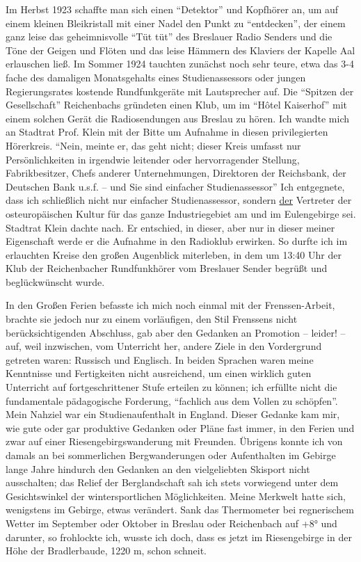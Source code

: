 \documentclass[a5paper,pagesize,10pt,twoside=true]{scrbook}
\begin{document}
Im Herbst 1923 schaffte man sich einen \enquote{Detektor} und Kopfhörer an, um auf einem kleinen Bleikristall mit einer Nadel den Punkt zu \enquote{entdecken}, der einem ganz leise das geheimnisvolle \enquote{Tüt tüt} des Breslauer Radio Senders und die Töne der Geigen und Flöten und das leise Hämmern des Klaviers der Kapelle Aal erlauschen ließ. Im Sommer 1924 tauchten zunächst noch sehr teure, etwa das 3-4 fache des damaligen Monatsgehalts eines Studienassessors oder jungen Regierungsrates kostende Rundfunkgeräte mit Lautsprecher auf. Die \enquote{Spitzen der Gesellschaft} Reichenbachs gründeten einen Klub, um im \enquote{Hôtel Kaiserhof} mit einem solchen Gerät die Radiosendungen aus Breslau zu hören. Ich wandte mich an Stadtrat Prof. Klein mit der Bitte um Aufnahme in diesen privilegierten Hörerkreis. \enquote{Nein, meinte er, das geht nicht; dieser Kreis umfasst nur Persönlichkeiten in irgendwie leitender oder hervorragender Stellung, Fabrikbesitzer, Chefs anderer Unternehmungen, Direktoren der Reichsbank, der Deutschen Bank u.s.f. -- und Sie sind einfacher Studienassessor} Ich entgegnete, dass ich schließlich nicht nur einfacher Studienassessor, sondern \underline{der} Vertreter der osteuropäischen Kultur für das ganze Industriegebiet am und im Eulengebirge sei. Stadtrat Klein dachte nach. Er entschied, in dieser, aber nur in dieser meiner Eigenschaft werde er die Aufnahme in den Radioklub erwirken. So durfte ich im erlauchten Kreise den großen Augenblick miterleben, in dem um 13:40 Uhr der Klub der Reichenbacher Rundfunkhörer vom Breslauer Sender begrüßt und beglückwünscht wurde.

In den Großen Ferien befasste ich mich noch einmal mit der Frenssen-Arbeit, brachte sie jedoch nur zu einem vorläufigen, den Stil Frenssens nicht berücksichtigenden Abschluss, gab aber den Gedanken an Promotion -- leider! -- auf, weil inzwischen, vom Unterricht her, andere Ziele in den Vordergrund getreten waren: Russisch und Englisch. In beiden Sprachen waren meine Kenntnisse und Fertigkeiten nicht ausreichend, um einen wirklich guten Unterricht auf fortgeschrittener Stufe erteilen zu können; ich erfüllte nicht die fundamentale pädagogische Forderung, \enquote{fachlich aus dem Vollen zu schöpfen}. Mein Nahziel war ein Studienaufenthalt in England. Dieser Gedanke kam mir, wie gute oder gar produktive Gedanken oder Pläne fast immer, in den Ferien und zwar auf einer Riesengebirgswanderung mit Freunden. Übrigens konnte ich von damals an bei sommerlichen Bergwanderungen oder Aufenthalten im Gebirge lange Jahre hindurch den Gedanken an den vielgeliebten Skisport nicht ausschalten; das Relief der Berg\-land\-schaft sah ich stets vorwiegend unter dem Gesichtswinkel der wintersportlichen Möglichkeiten. Meine Merkwelt hatte sich, wenigstens im Gebirge, etwas verändert. Sank das Thermometer bei regnerischem Wetter im September oder Oktober in Breslau oder Reichenbach auf +8° und darunter, so frohlockte ich, wusste ich doch, dass es jetzt im Riesengebirge in der Höhe der Bradlerbaude, 1220 m, schon schneit.
\end{document}
